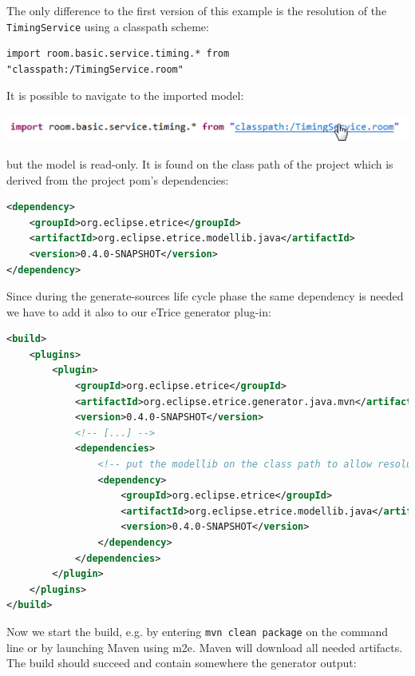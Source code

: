 The only difference to the first version of this example is the resolution of the \texttt{TimingService} using
a classpath scheme:

\begin{lstlisting}[language=ROOM]
import room.basic.service.timing.* from "classpath:/TimingService.room"
\end{lstlisting}

It is possible to navigate to the imported model:

\includegraphics{images/042-navigate-import.png}

but the model is read-only. It is found on the class path of the project which is derived from the project pom's dependencies:

\begin{lstlisting}[language=XML]
<dependency>
	<groupId>org.eclipse.etrice</groupId>
	<artifactId>org.eclipse.etrice.modellib.java</artifactId>
	<version>0.4.0-SNAPSHOT</version>
</dependency>
\end{lstlisting}

Since during the generate-sources life cycle phase the same dependency is needed we have to add it also to
our eTrice generator plug-in:

\begin{lstlisting}[language=XML]
<build>
	<plugins>
		<plugin>
			<groupId>org.eclipse.etrice</groupId>
			<artifactId>org.eclipse.etrice.generator.java.mvn</artifactId>
			<version>0.4.0-SNAPSHOT</version>
			<!-- [...] -->
			<dependencies>
				<!-- put the modellib on the class path to allow resolution of models by the generator -->
				<dependency>
					<groupId>org.eclipse.etrice</groupId>
					<artifactId>org.eclipse.etrice.modellib.java</artifactId>
					<version>0.4.0-SNAPSHOT</version>
				</dependency>
			</dependencies>
		</plugin>
	</plugins>
</build>
\end{lstlisting}

Now we start the build, e.g. by entering \texttt{mvn clean package} on the command line or by launching Maven
using m2e. Maven will download all needed artifacts. The build should succeed and contain somewhere the generator
output:

